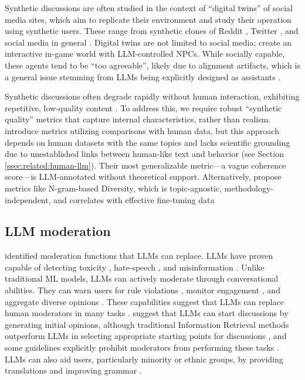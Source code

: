 Synthetic discussions are often studied in the context of “digital twins” of social media sites, which aim to replicate their environment and study their operation using synthetic users. These range from synthetic clones of Reddit \cite{park_simulacra}, Twitter \cite{mou_2024}, and social media in general \cite{tornberg_2023, y_social}. Digital twins are not limited to social media; \citet{Park2023GenerativeAI} create an interactive in-game world with \ac{LLM}-controlled \acp{NPC}. While socially capable, these agents tend to be “too agreeable”, likely due to alignment artifacts, which is a general issue stemming from \acp{LLM} being explicitly designed as assistants \cite{anthis_2025}. 

Synthetic discussions often degrade rapidly without human interaction, exhibiting repetitive, low-quality content \citep{ulmer2024}. To address this, we require robust “synthetic quality” metrics that capture internal characteristics, rather than realism. \citet{balog_2024} introduce metrics utilizing comparisons with human data, but this approach depends on human datasets with the same topics and lacks scientific grounding due to unestablished links between human-like text and behavior (see Section \ref{ssec:related:human-llm}). Their most generalizable metric—a vague coherence score—is \ac{LLM}-annotated without theoretical support. Alternatively, \citet{ulmer2024} propose metrics like N-gram-based Diversity, which is topic-agnostic, methodology-independent, and correlates with effective fine-tuning data


\subsection{LLM moderation}

\citet{korre2025evaluation} identified moderation functions that \acp{LLM} can replace. \acp{LLM} have proven capable of detecting toxicity \cite{kang-qian-2024-implanting, Wang2022ToxicityDW}, hate-speech \cite{Nirmal2024TowardsIH, shi-2024-hatespeech}, and misinformation \cite{Liu2024DetectIJ, Xu2024ACS}. Unlike traditional \ac{ML} models, \acp{LLM} can actively moderate through conversational abilities. They can warn users for rule violations \cite{Kumar_AbuHashem_Durumeric_2024}, monitor engagement \cite{schroeder-etal-2024-fora}, and aggregate diverse opinions \cite{small-polis-llm}. These capabilities suggest that \acp{LLM} can replace human moderators in many tasks \cite{small-polis-llm, seering_self_moderation}. \citet{small-polis-llm} suggest that \acp{LLM} can start discussions by generating initial opinions, although traditional Information Retrieval methods outperform \acp{LLM} in selecting appropriate starting points for discussions \cite{karadzhov2023delidata}, and some guidelines explicitly prohibit moderators from performing these tasks \cite{dimitra-book}. \acp{LLM} can also aid users, particularly minority or ethnic groups, by providing translations and improving grammar \cite{Tsai2024Generative}. 


